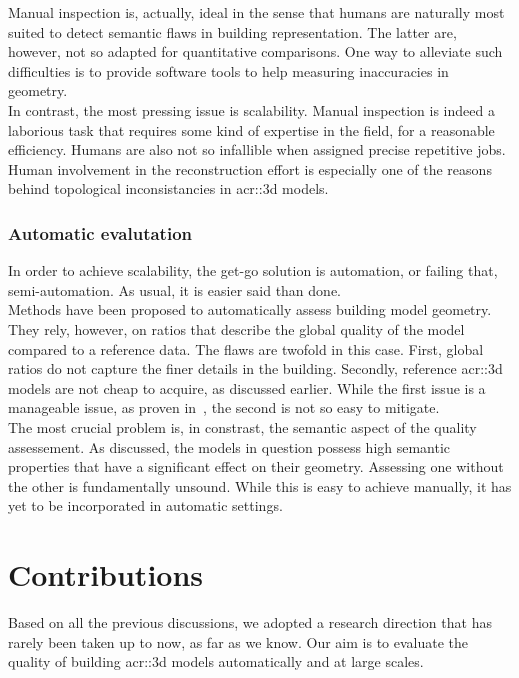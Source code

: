             Manual inspection is, actually, ideal in the sense that humans are naturally most suited to detect semantic flaws in building representation.
            The latter are, however, not so adapted for quantitative comparisons.
            One way to alleviate such difficulties is to provide software tools to help measuring inaccuracies in geometry\addref.\\

            In contrast, the most pressing issue is scalability.
            Manual inspection is indeed a laborious task that requires some kind of expertise in the field, for a reasonable efficiency.
            Humans are also not so infallible when assigned precise repetitive jobs.
            Human involvement in the reconstruction effort is especially one of the reasons behind topological inconsistancies in \gls{acr::3d} models.

        \subsubsection{Automatic evalutation}
            In order to achieve scalability, the get-go solution is automation, or failing that, semi-automation.
            As usual, it is easier said than done.\\

            Methods have been proposed to automatically assess building model geometry.
            They rely, however, on ratios that describe the global quality of the model compared to a reference data.
            The flaws are twofold in this case.
            First, global ratios do not capture the finer details in the building.
            Secondly, reference \gls{acr::3d} models are not cheap to acquire, as discussed earlier.
            While the first issue is a manageable issue, as proven in~\textcite{rottensteiner2012isprs}, the second is not so easy to mitigate.\\

            The most crucial problem is, in constrast, the semantic aspect of the quality assessement.
            As discussed, the models in question possess high semantic properties that have a significant effect on their geometry.
            Assessing one without the other is fundamentally unsound.
            While this is easy to achieve manually, it has yet to be incorporated in automatic settings.
\section{Contributions}
    \label{sec::introduction::contributions}
    Based on all the previous discussions, we adopted a research direction that has rarely been taken up to now, as far as we know.
    Our aim is to evaluate the quality of building \gls{acr::3d} models automatically and at large scales.\\

